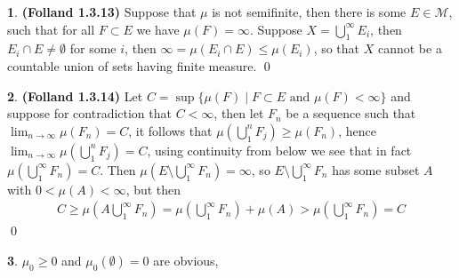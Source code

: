 \documentclass[10.5pt]{article}
\theoremstyle{definition}
\newtheorem{pb}{}
\newcommand{\set}[1]{\{#1\}}
\newcommand{\tand}{\text{ and }}
\begin{document}
    \begin{pb}\textbf{(Folland 1.3.13)}
        Suppose that \(\mu\) is not semifinite, then there is some \(E \in \mathcal{M}\), such that for all \(F \subset E\) we have \(\mu(F) = \infty\). Suppose \(X = \bigcup_1^\infty E_i\), then \(E_i \cap E \neq \emptyset\) for some \(i\), then \(\infty = \mu(E_i \cap E) \leq \mu(E_i)\), so that \(X\) cannot be a countable union of sets having finite measure. \qed
    \end{pb}
    \begin{pb}\textbf{(Folland 1.3.14)}
        Let \(C = \sup\set{\mu(F) \mid F \subset E \tand \mu(F) < \infty}\) and suppose for contradiction that \(C < \infty\), then let \(F_n\) be a sequence such that \(\lim_{n\to\infty}\mu(F_n) = C\), it follows that \(\mu(\bigcup_1^n F_j) \geq \mu(F_n)\), hence \(\lim_{n\to\infty}\mu(\bigcup_1^n F_j) = C\), using continuity from below we see that in fact \(\mu(\bigcup_1^\infty F_n) = C\). Then \(\mu(E \setminus \bigcup_1^\infty F_n) = \infty\), so \(E \setminus \bigcup_1^\infty F_n\) has some subset \(A\) with \(0 < \mu(A) < \infty\), but then
        \begin{align*}
            C \geq \mu(A\bigcup_1^\infty F_n) = \mu(\bigcup_1^\infty F_n) + \mu(A) > \mu(\bigcup_1^\infty F_n) = C
        \end{align*} \qed
    \end{pb}
    \begin{pb}
        \(\mu_0 \geq 0\) and \(\mu_0(\emptyset) = 0\) are obvious, 
    \end{pb}
\end{document}
